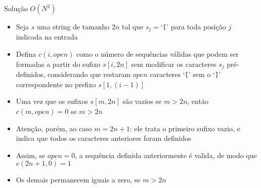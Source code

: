 \begin{frame}[fragile]{Solução $O(N^2)$}

    \begin{itemize}
        \item Seja $s$ uma string de tamanho $2n$ tal que $s_j = $`\texttt{[}' para toda posição
            $j$ indicada na entrada

        \item Defina $c(i, open)$ como o número de sequências válidas que podem ser formadas 
            a partir do sufixo $s[i, 2n]$ sem modificar os caracteres $s_j$ pré-definidos,
            considerando que restaram $open$ caracteres `\texttt{[}' sem o `\texttt{]}' 
            correspondente no prefixo $s[1, (i-1)]$

        \item Uma vez que os sufixos $s[m, 2n]$ são vazios se $m > 2n$, então $c(m, open) = 0$ se
            $m > 2n$

        \item Atenção, porém, ao caso $m = 2n + 1$: ele trata o primeiro sufixo vazio, e indica
            que todos os caracteres anteriores foram definidos

        \item Assim, se $open = 0$, a sequência definida anteriormente é valida, de modo que
            $c(2n + 1, 0) = 1$

        \item Os demais permanecem iguais a zero, se $m > 2n$

    \end{itemize}

\end{frame}

